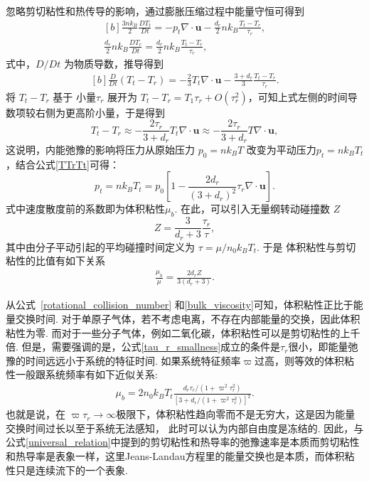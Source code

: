 忽略剪切粘性和热传导的影响，通过膨胀压缩过程中能量守恒可得到
\begin{equation}
\begin{aligned}[b]
\frac{3nk_B}{2}\frac{DT_t}{Dt}=-p_t\nabla\cdot\bm{u}-\frac{d_r}{2}nk_B\frac{T_t-T_r}{\tau_r},\\
\frac{d_r}{2}nk_B\frac{DT_r}{Dt}=\frac{d_r}{2}nk_B\frac{T_t-T_r}{\tau_r},
\end{aligned}
\end{equation}
式中，$D/Dt$ 为物质导数，推导得到
\begin{equation}
\begin{aligned}[b]
\frac{D}{Dt}(T_t-T_r)=-\frac{2}{3}T_t\nabla\cdot\bm{u}-\frac{3+d_r}{3}\frac{T_t-T_r}{\tau_r}.
\end{aligned}
\end{equation}
将 $T_t-T_r$ 基于 小量$\tau_r$ 展开为 $T_t-T_r=T_1\tau_r+O(\tau^2_r)$，可知上式左侧的时间导数项较右侧为更高阶小量，于是得到
\begin{equation}\label{tau_r_smallness}
T_t-T_r\approx-\frac{2\tau_r}{3+d_r}{T_t\nabla\cdot\bm{u}}\approx-\frac{2\tau_r}{3+d_r}{T\nabla\cdot\bm{u}},
\end{equation}
这说明，内能弛豫的影响将压力从原始压力 $p_0=nk_BT$ 改变为平动压力$p_t=nk_BT_t$，结合公式\eqref{TTrTt}可得：
\begin{equation}
p_t=nk_BT_t=p_0\left[1-\frac{2d_r}{(3+d_r)^2}\tau_r\nabla\cdot\bm{u}\right].
\end{equation}
式中速度散度前的系数即为体积粘性${\mu_b}$. 在此，可以引入无量纲转动碰撞数 $Z$
\begin{equation}\label{rotational_collision_number}
Z=\frac{3}{d_r+3}\frac{\tau_r}{\tau},
\end{equation}
其中由分子平动引起的平均碰撞时间定义为 $\tau={\mu}/{n_0k_BT_t}$. 于是 体积粘性与剪切粘性的比值有如下关系
\begin{eqnarray}\label{bulk_viscosity}
\frac{\mu_b}{\mu}=\frac{2d_rZ}{3(d_r+3)}.
\end{eqnarray}

从公式~\eqref{rotational_collision_number} 和\eqref{bulk_viscosity}可知，体积粘性正比于能量交换时间.  对于单原子气体，若不考虑电离，不存在内部能量的交换，因此体积粘性为零. 而对于一些分子气体，例如二氧化碳，体积粘性可以是剪切粘性的上千倍\cite{jiangzongling2016}.  但是，需要强调的是，公式\eqref{tau_r_smallness}成立的条件是$\tau_r$很小，即能量弛豫的时间远远小于系统的特征时间.  如果系统特征频率$\varpi$过高，则等效的体积粘性一般跟系统频率有如下近似关系\cite{Bruno2015PoF,Meador1996PoF,CRBS_JCP,Jaeger2018JCP}: 
\begin{eqnarray}
\mu_b=2n_0k_BT_t\frac{d_r\tau_r/(1+\varpi^2\tau^2_r)}{[3+d_r/(1+\varpi^2\tau^2_r)]^2}. \label{bulk_frequency}
\end{eqnarray}
也就是说，在 $\varpi\tau_r\rightarrow\infty$极限下，体积粘性趋向零而不是无穷大，这是因为能量交换时间过长以至于系统无法感知， 此时可以认为内部自由度是冻结的. 因此，与公式\eqref{universal_relation}中提到的剪切粘性和热导率的弛豫速率是本质而剪切粘性和热导率是表象一样，这里Jeans-Landau方程里的能量交换也是本质，而体积粘性只是连续流下的一个表象. 


